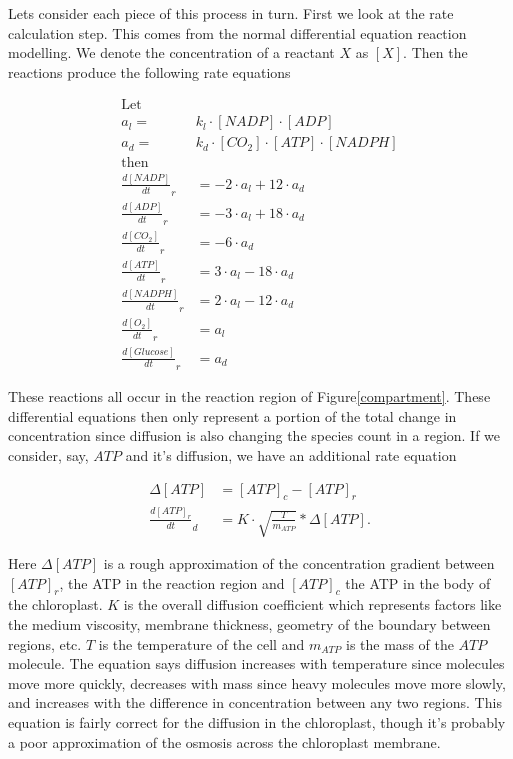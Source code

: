 \documentclass[12pt,reqno]{amsart}
\begin{document}
    Lets consider each piece of this process in turn.  First we look
    at the rate calculation step.  This comes from the normal differential
    equation reaction modelling. We denote the concentration of a reactant
    $X$ as $[X]$.  Then the reactions produce the following rate equations
    
    \begin{align*}
        \textrm{Let}&\\
        a_l =& k_l\cdot[NADP]\cdot[ADP] \\
        a_d =& k_d\cdot[CO_2]\cdot[ATP]\cdot[NADPH] \\
        \textrm{then}&\\
        \frac{d[NADP]}{dt}_r &= -2\cdot a_l + 12 \cdot a_d \\
        \frac{d[ADP]}{dt}_r &= -3\cdot a_l + 18 \cdot a_d \\
        \frac{d[CO_2]}{dt}_r &= - 6 \cdot a_d \\
        \frac{d[ATP]}{dt}_r &= 3\cdot a_l - 18 \cdot a_d \\
        \frac{d[NADPH]}{dt}_r &= 2\cdot a_l - 12 \cdot a_d \\
        \frac{d[O_2]}{dt}_r &=  a_l\\
        \frac{d[Glucose]}{dt}_r &= a_d 
    \end{align*}
	
	These reactions all occur in the reaction region of Figure\ref{compartment}.
	These differential equations then only represent a portion of the total
	change in concentration since diffusion is also changing the species count
	in a region. If we consider, say, $ATP$ and it's diffusion, we have an 
	additional rate equation
	
	\begin{align*}
	    \Delta [ATP] &= [ATP]_c - [ATP]_r\\
	    \frac{d[ATP]_r}{dt}_d &= K\cdot\sqrt{\frac{T}{m_{ATP}}}*\Delta [ATP].
	\end{align*}

    Here $\Delta [ATP]$ is a rough approximation of the concentration gradient
    between $[ATP]_r$, the ATP in the reaction region and $[ATP]_c$ the ATP in 
    the body of the chloroplast. $K$ is the overall diffusion coefficient which 
    represents factors like the medium viscosity, membrane thickness, 
    geometry of the boundary between regions, etc.  $T$ is the temperature of the
    cell and $m_{ATP}$ is the mass of the $ATP$ molecule.  The equation says
    diffusion increases with temperature since molecules move more quickly, 
    decreases with mass since heavy molecules move more slowly, and increases with
    the difference in concentration between any two regions.  This equation is 
    fairly correct for the diffusion in the chloroplast, though it's probably a
    poor approximation of the osmosis across the chloroplast membrane.
    
\end{document}
